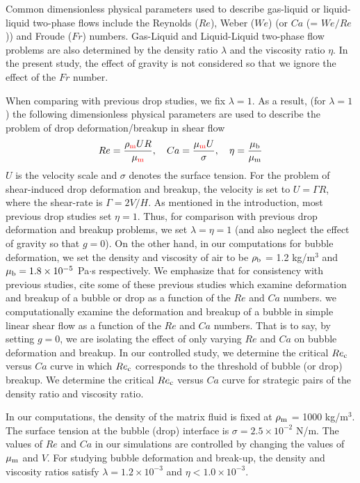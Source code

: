 \documentclass[%
 reprint,
 showkeys,
 amsmath,amssymb,
 aps,
 prfluids,
 onecolumn
]{revtex4-2}
\begin{document}
Common dimensionless physical parameters used to describe gas-liquid or
liquid-liquid two-phase flows include the Reynolds ($Re$), Weber ($We$) (or
$Ca$ (= $We/Re$)) and Froude ($Fr$) numbers.  Gas-Liquid and 
Liquid-Liquid two-phase flow problems are also determined by the
density ratio $\lambda$ and the viscosity ratio $\eta$.  
In the present study, the effect of gravity is not considered so
that we ignore the effect of the $Fr$ number.

When comparing with previous drop studies, we fix
$\lambda=1$.  As a result, (for $\lambda=1$) the
following dimensionless physical parameters are used to describe the problem of
drop deformation/breakup in shear flow
%
\begin{eqnarray}\label{dimensonless}
  Re = \frac{\rho_{\rm {\color{red}m}}UR}{\mu_{\rm {\color{red}m}}}, \quad
  Ca = \frac{\mu_{\rm {\color{red}m}}U}{\sigma}, \quad
  \eta = \frac{\mu_{\rm b}}{\mu_{\rm m}}
\end{eqnarray}
%
$U$ is the velocity scale and $\sigma$ denotes the surface tension. 
For the problem of shear-induced drop deformation and breakup, 
the velocity is set to 
$U = \mathit{\Gamma} R$, where the shear-rate is $\mathit{\Gamma} = 2V/H$.  
As mentioned in the introduction, most previous drop studies set 
$\eta = 1$\cite{?}. 
Thus, for comparison with previous drop deformation and breakup problems,
we set $\lambda = \eta = 1$ (and also neglect the 
effect of gravity so that $g=0$). On the other hand, in 
our computations for bubble deformation, 
we set the density and viscosity of air to be
$\rho_{\rm b}$ = 1.2 kg/m$^{3}$ and $\mu_{\rm b} = 1.8
\times 10^{-5}$ Pa$\cdot$s respectively.
We emphasize that for consistency with previous studies, 
{\color{blue} cite some of these previous studies which examine deformation
and breakup of a bubble or drop as a function of the $Re$ and $Ca$ numbers.}
we computationally examine the
deformation and breakup of a bubble in simple linear shear flow as a 
function of the $Re$ and $Ca$ numbers. 
{\color{red} That is to say, by setting $g=0$, we are isolating the
effect of only varying $Re$ and $Ca$ on bubble 
deformation and breakup.  In our controlled study, we determine 
the critical $Re_{\rm c}$ versus $Ca$ curve 
in which $Re_{\rm c}$ corresponds to the threshold of 
bubble (or drop) breakup.  
We determine the
critical $Re_{\rm c}$ versus $Ca$ curve for strategic pairs of the
density ratio and viscosity ratio. }

{\color{red} In our computations, the density of the matrix fluid 
is fixed at
$\rho_{\rm m}$ = 1000 kg/m$^3$.  The surface tension at the bubble (drop)
interface is $\sigma =2.5 \times 10^{-2}$ N/m.
The values of $Re$ and $Ca$ in our simulations are controlled by
changing the values of $\mu_{\rm m}$ and $V$.
For studying bubble deformation and break-up, 
the density and viscosity ratios satisfy 
$\lambda = 1.2 \times 10^{-3}$ and $\eta < 1.0 \times 10^{-3}$.}
\end{document}
